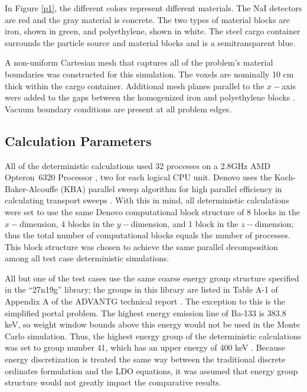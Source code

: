 \documentclass{article} %
\begin{document}
In Figure \ref{p1}, the different colors represent different materials. The NaI
detectors are red and the gray material is concrete. The two types of material
blocks are iron, shown in green, and polyethylene, shown in white. The steel
cargo container surrounds the particle source and material blocks and is a
semitransparent blue.

A non-uniform Cartesian mesh that captures all of the problem's material
boundaries was constructed for this simulation. The voxels are nominally 10 cm
thick within the cargo container. Additional mesh planes parallel to the
$x-$axis were added to the gaps between the homogenized iron and polyethylene
blocks \cite{advantg}. Vacuum boundary conditions are present at all problem
edges.

\subsection{Calculation Parameters}
\label{params}

All of the deterministic calculations used 32 processes on a 2.8GHz AMD
Opteron\texttrademark\ 6320 Processor \cite{amd}, two for each logical CPU
unit. Denovo uses the Koch-Baker-Alcouffe (KBA) parallel sweep algorithm for
high parallel efficiency in calculating transport sweeps \cite{denovo}. With
this in mind, all deterministic calculations were set to use the same Denovo
computational block structure of 8 blocks in the $x-$dimension, 4 blocks in
the $y-$dimension, and 1 block in the $z-$dimension; thus the total number of
computational blocks equals the number of processes. This block structure was
chosen to achieve the same parallel decomposition among all test case
deterministic simulations.

All but one of the test cases use the same coarse energy group structure
specified in the ``27n19g'' library; the groups in this library are listed in
Table A-1 of Appendix A of the ADVANTG technical report \cite{advantg}. The
exception to this is the simplified portal problem. The highest energy
emission line of Ba-133 is 383.8 keV, so weight window bounds above this
energy would not be used in the Monte Carlo simulation. Thus, the highest
energy group of the deterministic calculations was set to group number 41,
which has an upper energy of 400 keV \cite{advantg}. Because 
energy discretization is treated the same way between the traditional discrete 
ordinates formulation and the LDO equations, it was assumed that energy group 
structure would not greatly impact the comparative results.
\end{document}
